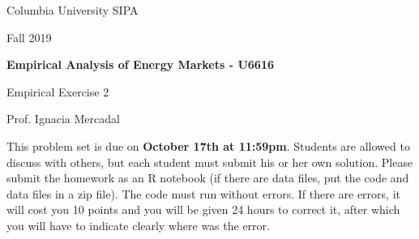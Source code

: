 \documentclass[11pt]{article}
\begin{document}
\begin{flushleft}
Columbia University SIPA	

Fall 2019

\end{flushleft}


\begin{center}
\textbf{Empirical Analysis of Energy Markets - U6616}

Empirical Exercise 2

\end{center}

\begin{flushright}
Prof. Ignacia Mercadal	
\end{flushright}

This problem set is due on \textbf{October 17th at 11:59pm}. Students are allowed to discuss with others, but each student must submit his or her own solution. Please submit the homework as an R notebook (if there are data files,  put the code and data files in a zip file). The code must run without errors. If there are errors, it will cost you 10 points and you will be given 24 hours to correct it, after which you will have to indicate clearly where was the error. 
 
\end{document}
